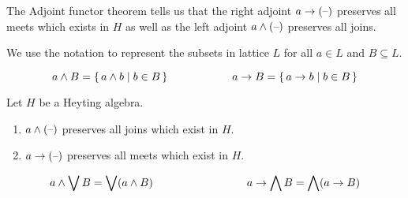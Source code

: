 %
%
The Adjoint functor theorem tells us that 
the right adjoint $a \to {(\mbox{\textendash})}$ preserves all meets which exists in $H$
as well as the left adjoint $ a \wedge {(\mbox{\textendash})}$ preserves all joins. 

\newcommand{\LTCbigwedge}{\bigvee ( a \LTCmeet B) }
\newcommand{\LTCbigimp}{\bigwedge ( a \LTCimp B )}

We use the notation to represent the subsets in lattice $L$
for all $a \in L$ and $B \subseteq L$. 

 \[ a \wedge B = \set{a \wedge b |  b \in B}
 \hskip 2cm 
     a \to B = \set{a \to b |  b \in B}
\]

\begin{proposition} \label{HeytingAFT}
Let $H$ be a Heyting algebra. 
\begin{enumerate}
\item $a \wedge {(\mbox{\textendash})}$ preserves all joins which exist in $H$. 
\item $a \to {(\mbox{\textendash})}$ preserves all meets which exist in $H$. 
\end{enumerate}
%
\[ 
a \LTCmeet \bigvee B  = \LTCbigwedge
\hskip 3cm
a \LTCimp  \bigwedge B = \LTCbigimp
\]
%
\end{proposition}

